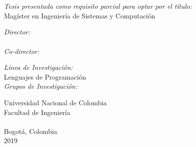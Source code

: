 \documentclass[
11pt, %
english, %
singlespacing, %
headsepline, %
]{MastersDoctoralThesis} %
\begin{document}

\begin{titlepage}
\begin{center}

\HRule \\[0.4cm] %
{\huge \bfseries \ttitle\par}\vspace{0.4cm} %
\HRule \\[2cm] %

{\Large \authorname}

\vfill

\begin{spanish}
\textit{\large Tesis presentada como requisito parcial para optar por el título:} \\
Magíster en Ingeniería de Sistemas y Computación\\[0.3cm] %

\vfill

\emph{Director:} \\
\supname
\\[2mm]
\emph{Co-director:} \\
\cosupname

\vfill

\textit{\large Línea de Investigación:}\\
Lenguajes de Programación
\\[0.3cm] %
\textit{\large Grupos de Investigación:}\\
\groupname%
\end{spanish}

\vfill

\begin{spanish}
Universidad Nacional de Colombia\\
Facultad de Ingeniería\\
\deptname\\
Bogotá, Colombia\\
2019
\end{spanish}

\end{center}
\end{titlepage}


\cleardoublepage
\end{document}
